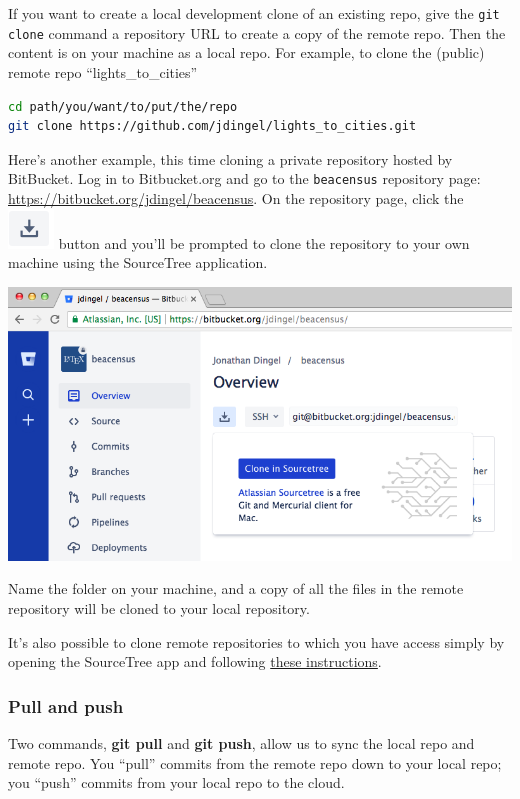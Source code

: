 If you want to create a local development clone of an existing repo,
give the \texttt{git clone} command a repository URL to create a copy of the remote repo.
Then the content is on your machine as a local repo.
For example, to clone the (public) remote repo ``lights\_to\_cities''
\begin{lstlisting}[language=bash]
cd path/you/want/to/put/the/repo
git clone https://github.com/jdingel/lights_to_cities.git
\end{lstlisting}

Here's another example, this time cloning a private repository hosted by BitBucket.
Log in to Bitbucket.org and go to the \texttt{beacensus} repository page:
\url{https://bitbucket.org/jdingel/beacensus}.
On the repository page, click the
\includegraphics[width=.025\textwidth]{./figures/workflow/BitBucket_screeshot_cloneinsourcetree2.png}
button and you'll be prompted to clone the repository to your own machine using the SourceTree application.
\begin{center}
\includegraphics[width=.8\textwidth]{./figures/workflow/BitBucket_screeshot_cloneinsourcetree1.png}
\end{center}
Name the folder on your machine, and a copy of all the files in the remote repository will be cloned to your local repository.

It's also possible to clone remote repositories to which you have access simply by opening the SourceTree app and following \href{https://confluence.atlassian.com/get-started-with-sourcetree/clone-a-remote-repository-847359098.html}{these instructions}.

\subsubsection{Pull and push}

Two commands, \textbf{git pull} and \textbf{git push},
allow us to sync the local repo and remote repo.
You ``pull'' commits from the remote repo down to your local repo;
you ``push'' commits from your local repo to the cloud.


